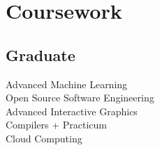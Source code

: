 \documentclass[]{azhagu-swe-resume-openfont}
\begin{document}
\begin{minipage}[t]{0.33\textwidth}
\sectionsep


\section{Coursework}
\subsection{Graduate}
Advanced Machine Learning \\
Open Source Software Engineering \\
Advanced Interactive Graphics \\
Compilers + Practicum \\
Cloud Computing \\
\sectionsep


\end{minipage} 
\hfill
\end{document}
